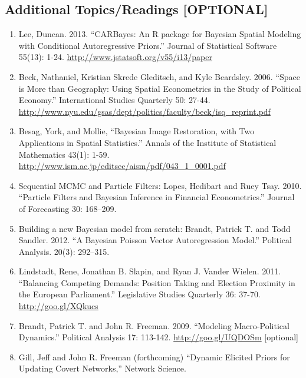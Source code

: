 \documentclass[11pt, leqno, fleqn]{article}
\begin{document}
\subsection*{Additional Topics/Readings [OPTIONAL]}
	\begin{enumerate}
	\item[] Lee, Duncan. 2013. ``CARBayes: An R package for Bayesian Spatial Modeling with Conditional Autoregressive Priors.'' Journal of Statistical Software 55(13): 1-24. \url{http://www.jstatsoft.org/v55/i13/paper}
	\item[] Beck, Nathaniel, Kristian Skrede Gleditsch, and Kyle Beardsley. 2006. ``Space is More than Geography: Using Spatial Econometrics in the Study of Political Economy.'' International Studies Quarterly 50: 27-44. \url{http://www.nyu.edu/gsas/dept/politics/faculty/beck/isq_reprint.pdf}
	\item[] Besag, York, and Mollie, ``Bayesian Image Restoration, with Two Applications in Spatial Statistics.'' Annals of the Institute of Statistical Mathematics 43(1): 1-59. \url{http://www.ism.ac.jp/editsec/aism/pdf/043_1_0001.pdf}
	\item[]  Sequential MCMC and Particle Filters: Lopes, Hedibart and Ruey Tsay. 2010. ``Particle Filters and Bayesian Inference in Financial Econometrics.'' Journal of Forecasting 30: 168--209.
	\item[] Building a new Bayesian model from scratch: Brandt, Patrick T. and Todd Sandler. 2012. ``A Bayesian Poisson Vector Autoregression Model.'' Political Analysis. 20(3): 292--315.
	\item[] Lindstadt, Rene, Jonathan B. Slapin, and Ryan J. Vander Wielen. 2011. ``Balancing Competing Demands: Position Taking and Election Proximity in the European Parliament.'' Legislative Studies Quarterly 36: 37-70. \url{http://goo.gl/XQkucs}
	\item[] Brandt, Patrick T. and John R. Freeman. 2009. ``Modeling Macro-Political Dynamics.'' Political Analysis 17: 113-142. \url{http://goo.gl/UQDOSm} [optional]
 	\item[] Gill, Jeff and John R. Freeman (forthcoming) ``Dynamic Elicited Priors for
 Updating Covert Networks,'' Network Science.
	\end{enumerate}
\end{document}

